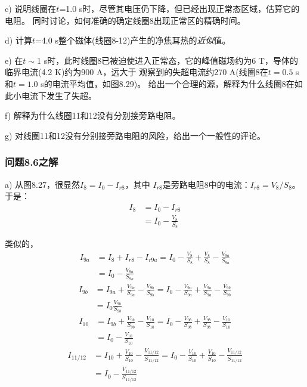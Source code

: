 c) 说明线圈在$t$=1.0 s时，尽管其电压仍下降，但已经出现正常态区域，估算它的电阻。
同时讨论，如何准确的确定线圈8出现正常区的精确时间。

d) 计算$t$=4.0 s整个磁体(线圈8-12)产生的净焦耳热的\textit{近似}值。

e) 在$t\sim$1 s时，此时线圈8已被迫使进入正常态，它的峰值磁场约为6 T，导体的临界电流(4.2 K)约为900 A，远大于
观察到的失超电流约270 A(线圈8在$t=0.5$ s和$t=1.0$ s的电流平均值，如图8.29)。
给出一个合理的源，解释为什么线圈8在如此小电流下发生了失超。

f) 解释为什么线圈11和12没有分别接旁路电阻。

g) 对线圈11和12没有分别接旁路电阻的风险，给出一个一般性的评论。

\subsubsection{问题8.6之解}
a) 从图8.27，很显然$I_8=I_0-I_{r8}$，其中
$I_{r8}$是旁路电阻8中的电流：$I_{r8}=V_8/S_8$。于是：
\begin{align*}%
I_8&=I_0-I_{r8} \\
& =I_0-\frac{V_8}{S_8} \tag{8.83a}
\end{align*}

类似的，
\begin{align*}%
I_{9a}&=I_8+I_{r8}-I_{r9a}=I_0-\frac{V_8}{S_8}+\frac{V_8}{S_8}-\frac{V_{9a}}{S_{9a}}\\
&=I_0-\frac{V_{9a}}{S_{9a}} \tag{8.83b}
\end{align*}
\begin{align*}
I_{9b}&=I_{9a}+\frac{V_{9a}}{S_{9a}}-\frac{V_{9b}}{S_{9b}}=I_0-\frac{V_{9a}}{S_{9a}}+\frac{V_{9a}}{S_{9a}}-\frac{V_{9b}}{S_{9b}} \\
&=I_0\frac{V_{9b}}{S_{9b}}\tag{8.83c}
\end{align*}
\begin{align*}
I_{10}&=I_{9b}+\frac{V_{9b}}{S_{9b}}-\frac{V_{10}}{S_{10}}=I_0-\frac{V_{9b}}{S_{9b}}+\frac{V_{9b}}{S_{9b}}-\frac{V_{10}}{S_{10}}\\
&=I_0-\frac{V_{10}}{S_{10}}\tag{8.83d}
\end{align*}
\begin{align*}
I_{11/12}&=I_{10}+\frac{V_{10}}{S_{10}}-\frac{V_{11/12}}{S_{11/12}}=I_0-\frac{V_{10}}{S_{10}}+\frac{V_{10}}{S_{10}}-\frac{V_{11/12}}{S_{11/12}}\\
&=I_0-\frac{V_{11/12}}{S_{11/12}} \tag{8.83e}
\end{align*}

